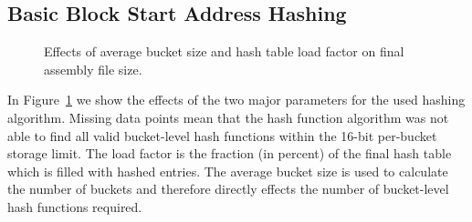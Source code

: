 \documentclass[course=eragp]{aspdoc}
\begin{document}
\subsection{Basic Block Start Address Hashing}

\begin{figure}
    \begin{centering}
        \caption{Effects of average bucket size and hash table load factor on final assembly file size.}\label{hashing_figure}
    \end{centering}
\end{figure}

In Figure~\ref{hashing_figure} we show the effects of the two major parameters for the used hashing
algorithm. Missing data points mean that the hash function algorithm was not able to find all valid
bucket-level hash functions within the 16-bit per-bucket storage limit. The load factor is the fraction (in percent) of the
final hash table which is filled with
hashed entries. The average bucket size is used to calculate the number of buckets and therefore
directly effects the number of bucket-level hash functions required.
\end{document}
